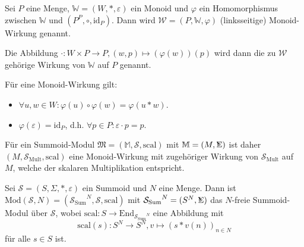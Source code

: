 \documentclass{article}
\DeclareMathOperator*{\Sigmacirc}{%
  \ThisStyle{\mathop{\ensurestackMath{\stackinset{c}{-0.75\LMpt}{c}{}{%
  \rotatebox[origin=lb]{-90}{$\circ$}}{\SavedStyle\Sigma}}}}}
\begin{document}
\begin{definition}
  Sei $P$ eine Menge, $\mathbb{W} = (W, \ast, \varepsilon)$ ein Monoid
  und $\varphi$ ein Homomorphismus zwischen $\mathbb{W}$ und $(P^P, \circ, \text{id}_P)$.
  Dann wird $\mathcal{W} = (P, \mathbb{W}, \varphi)$ (linksseitige) Monoid-Wirkung
  genannt.

  Die Abbildung $\cdot \colon W \times P \to P, (w, p) \mapsto (\varphi(w))(p)$
  wird dann die zu $\mathcal{W}$ gehörige Wirkung von $\mathbb{W}$ auf $P$ genannt.
\end{definition}

\begin{remark}
  Für eine Monoid-Wirkung gilt:
  \begin{itemize}
    \item $\forall u, w \in W \colon \varphi(u) \circ \varphi(w) = \varphi(u \ast w)$.
    \item $\varphi(\varepsilon) = \text{id}_P$, d.h. $\forall p \in P \colon \varepsilon \cdot p = p$.
  \end{itemize}
\end{remark}

\begin{remark}
  Für ein Summoid-Modul $\mathfrak{M} = (\mathbb{M}, \mathcal{S}, \text{scal})$ mit $\mathbb{M} = (M, \Sigmacirc)$
  ist daher $(M, \mathcal{S}_\text{Mult}, \text{scal})$ eine Monoid-Wirkung
  mit zugehöriger Wirkung von $\mathcal{S}_\text{Mult}$ auf $M$,
  welche der skalaren Multiplikation entspricht.
\end{remark}

\begin{definition}
  Sei $\mathcal{S} = (S, \Sigma, \ast, \varepsilon)$ ein Summoid und $N$ eine Menge.
  Dann ist $\text{Mod}(\mathcal{S}, N) = ({\mathcal{S}_\text{Sum}}^N, \mathcal{S}, \text{scal})$
  mit ${\mathcal{S}_\text{Sum}}^N = (S^N, \Sigmacirc)$
  das $N$-freie Summoid-Modul über $\mathcal{S}$, wobei
  $\text{scal} \colon S \to \text{End}_{{\mathcal{S}_\text{Sum}}^N}$ eine Abbildung mit
  \begin{equation*}
    \text{scal}(s) \colon S^N \to S^N, v \mapsto (s \ast v(n))_{n \in N}
  \end{equation*}
  für alle $s \in S$ ist.
\end{definition}
\end{document}
